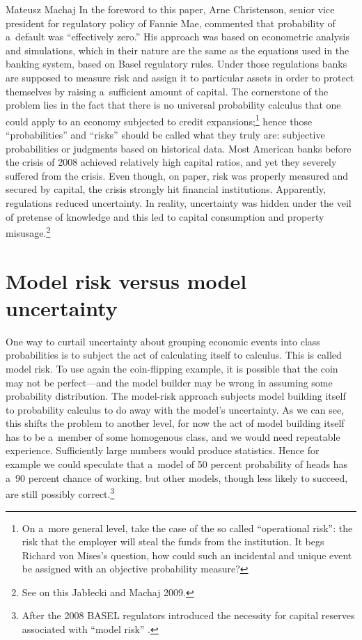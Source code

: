 \begin{artengenv}{Mateusz Machaj}
In the foreword to this paper, Arne Christenson, senior vice president for regulatory policy of Fannie Mae, commented that probability of a~default was ``effectively zero.'' His approach was based on econometric analysis and simulations, which in their nature are the same as the equations used in the banking system, based on Basel regulatory rules. Under those regulations banks are supposed to measure risk and assign it to particular assets in order to protect themselves by raising a~sufficient amount of capital. The cornerstone of the problem lies in the fact that there is no universal probability calculus that one could apply to an economy subjected to credit expansions;\footnote{On a~more general level, take the case of the so called ``operational risk'': the risk that the employer will steal the funds from the institution. It begs Richard von Mises's question, how could such an incidental and unique event be assigned with an objective probability measure?} hence those ``probabilities'' and ``risks'' should be called what they truly are: subjective probabilities or judgments based on historical data. Most American banks before the crisis of 2008 achieved relatively high capital ratios, and yet they severely suffered from the crisis. Even though, on paper, risk was properly measured and secured by capital, the crisis strongly hit financial institutions. Apparently, regulations reduced uncertainty. In reality, uncertainty was hidden under the veil of pretense of knowledge and this led to capital consumption and property misusage.\footnote{See on this Jabłecki and Machaj 2009.}



\section{Model risk versus model uncertainty}

One way to curtail uncertainty about grouping economic events into class probabilities is to subject the act of calculating itself to calculus. This is called model risk. To use again the coin-flipping example, it is possible that the coin may not be perfect---and the model builder may be wrong in assuming some probability distribution. The model-risk approach subjects model building itself to probability calculus to do away with the model's uncertainty. As we can see, this shifts the problem to another level, for now the act of model building itself has to be a~member of some homogenous class, and we would need repeatable experience. Sufficiently large numbers would produce statistics. Hence for example we could speculate that a~model of 50 percent probability of heads has a~90 percent chance of working, but other models, though less likely to succeed, are still possibly correct.\footnote{After the 2008 BASEL regulators introduced the necessity for capital reserves associated with ``model risk'' 
\parencite[][p.1295]{alexander_quantile_2012}.%
}




\end{artengenv}
